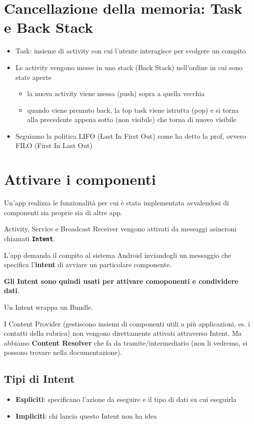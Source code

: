 \section{Cancellazione della memoria: Task e Back Stack}
\begin{itemize}
    \item Task: insieme di activity con cui l'utente interagisce per svolgere un compito
    \item Le activity vengono messe in uno stack (Back Stack) nell'ordine in cui sono state aperte
    \begin{itemize}
        \item la nuova activity viene messa (push) sopra a quella vecchia
        \item quando viene premuto back, la top task viene istrutta (pop) e si torna alla precedente appena sotto (non visibile) che torna di nuovo visibile
    \end{itemize}
    \item Seguiamo la politica LIFO (Last In First Out) come ha detto la prof, ovvero FILO (First In Last Out)
\end{itemize}

\section{Attivare i componenti}
\par Un'app realizza le funzionalità per cui è stata implementata avvalendosi di componenti sia proprie sia di altre app.
\par Activity, Service e Broadcast Receiver vengono attivati da messaggi asincroni chiamati \textbf{\texttt{Intent}}.
\par L'app demanda il compito al sistema Android inviandogli un messaggio che specifica l'\textbf{intent} di avviare un particolare componente.
\par \textbf{Gli Intent sono quindi usati per attivare comoponenti e condividere dati}.
\par Un Intent wrappa un Bundle.
\par I Content Provider (gestiscono insiemi di componenti utili a più applicazioni, es. i contatti della rubrica) non vengono direttamente attivati attraverso Intent. Ma abbiamo \textbf{Content Resolver} che fa da tramite/intermediario (non li vedremo, si possono trovare nella documentazione).

\subsection{Tipi di Intent}
\par 
\begin{itemize}
    \item \textbf{Espliciti}: specificano l'azione da eseguire e il tipo di dati su cui eseguirla
    \item \textbf{Impliciti}: chi lancia questo Intent non ha idea
\end{itemize}

